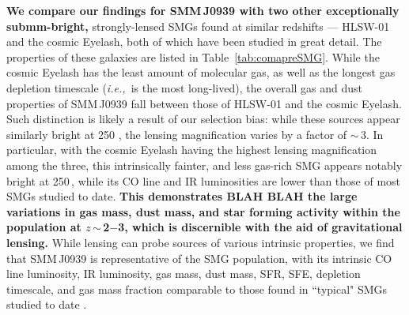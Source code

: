 \documentclass[iop, revtex4]{emulateapj}
\newcommand{\eg}{{\sl e.g.,~}}
\newcommand{\ie}{{\sl i.e.,~}}
\begin{document}
{\bf We
compare our findings for SMM\,J0939
 with two other exceptionally submm-bright,}
strongly-lensed SMGs
found at similar redshifts --- HLSW-01 and the cosmic Eyelash, both of which have been studied in great detail. The properties
of these galaxies are listed in Table~\ref{tab:comapreSMG}. While the cosmic Eyelash has the least amount of molecular gas, as well as
the
longest gas depletion timescale (\ie is the most long-lived), the overall gas and dust properties of SMM\,J0939 fall between those of HLSW-01 and the
cosmic
Eyelash. Such distinction is likely a result of our selection bias: while these sources appear similarly bright at 250 \micron, the lensing magnification
varies by a factor of $\sim$\,3. In particular, with the cosmic Eyelash having the highest lensing magnification among the
three, this
intrinsically fainter, and less gas-rich SMG appears notably bright
at 250\,\micron, while its CO line and IR luminosities are lower than those of most SMGs studied to date.
{\bf This demonstrates BLAH BLAH
the large variations in gas mass, dust mass, and star forming activity within the population at $z$\,$\sim$\,2$-$3, which is discernible with the aid of gravitational lensing.}
While lensing can probe sources
of various intrinsic properties, we find that SMM\,J0939 is representative of the SMG population, with its intrinsic CO line luminosity, IR luminosity, gas mass,
dust mass, SFR, SFE, depletion timescale, and gas mass fraction comparable to those found in ``typical" SMGs studied to date
\citep[\eg ][]{Greve05a,Tacconi08a}.
\end{document}
